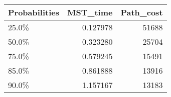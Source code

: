 \begin{tabular}{lrr}
\toprule
Probabilities &  MST\_time &  Path\_cost \\
\midrule
        25.0\% &  0.127978 &      51688 \\
        50.0\% &  0.323280 &      25704 \\
        75.0\% &  0.579245 &      15491 \\
        85.0\% &  0.861888 &      13916 \\
        90.0\% &  1.157167 &      13183 \\
\bottomrule
\end{tabular}
